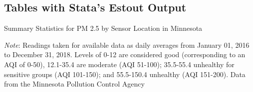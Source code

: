 \subsection{Tables with Stata's Estout Output}



\begin{singlespace}
\begin{table}[!htbp]
\caption{Summary Statistics for PM 2.5 by Sensor Location in Minnesota} \label{tab:city-sum-stats}
\begin{center}


\begin{minipage}{0.7\textwidth}
\small{\textit{Note}: Readings taken for available data as daily averages from January 01, 2016 to December 31, 2018. Levels of 0-12 are considered good (corresponding to an AQI of 0-50), 12.1-35.4 are moderate (AQI 51-100); 35.5-55.4 unhealthy for sensitive groups (AQI 101-150); and 55.5-150.4 unhealthy (AQI 151-200). Data from the Minnesota Pollution Control Agency}
\end{minipage}	  

\end{center}
\end{table}
\end{singlespace}



